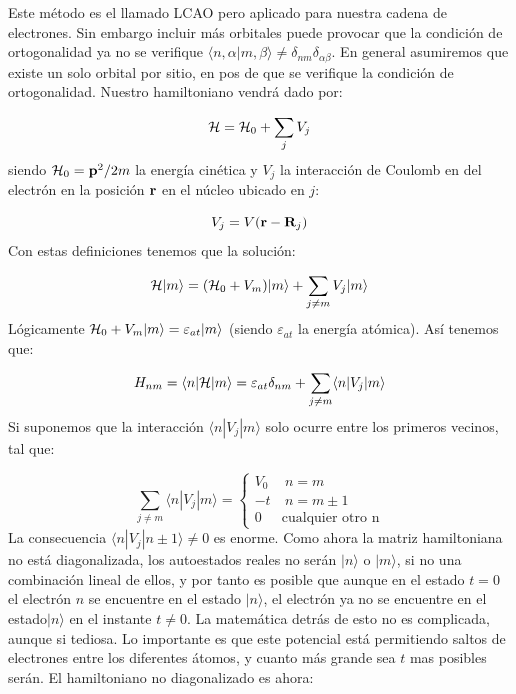 Este método es el llamado LCAO pero aplicado para nuestra cadena de electrones. Sin embargo incluir más orbitales puede provocar que la condición de ortogonalidad ya no se verifique $\langle n ,\alpha | m,\beta \rangle \neq \delta_{nm} \delta_{\alpha \beta}$. En general asumiremos que existe un solo orbital por sitio, en pos de que se verifique la condición de ortogonalidad. Nuestro hamiltoniano vendrá dado por:

\begin{equation}
	\mathcal{H} = \mathcal{H}_0 + \sum_{j} V_j
\end{equation}
siendo $\mathcal{H}_0 = \mathbf{p}^2 /2m$ la energía cinética y $V_j$ la interacción de Coulomb en del electrón en la posición $\mathbf{r}$ en el núcleo ubicado en $j$:

\begin{equation}
	V_j = V(\mathbf{r}-\mathbf{R}_j)
\end{equation}
Con estas definiciones tenemos que la solución:

\begin{equation}
	\mathcal{H} |m\rangle = (\mathcal{H}_0 + V_m) |m\rangle + \sum_{j\neq m} V_j |m\rangle
\end{equation}
Lógicamente $\mathcal{H}_0 +V_m |m\rangle = \varepsilon_{at}|m\rangle$ (siendo $\varepsilon_{at}$ la energía atómica). Así tenemos que:

\begin{equation}
	H_{nm} = \langle n | \mathcal{H} | m \rangle = \varepsilon_{at} \delta_{nm}+\sum_{j\neq m} \langle n |V_j |m\rangle
\end{equation}
Si suponemos que la interacción $\langle n | V_j | m \rangle$ solo ocurre entre los primeros vecinos, tal que:

\begin{equation}
	\sum_{j\neq m} \langle n |V_j |m\rangle = \left\lbrace \begin{array}{lc}
		V_0 & \ n=m \\
		-t & \ n=m\pm 1 \\
		 0 & \text{cualquier otro n}
	\end{array} \right.
\end{equation}
La consecuencia $\langle n|V_j|n\pm1\rangle \neq 0$ es enorme. Como ahora la matriz hamiltoniana no está diagonalizada, los autoestados reales no serán $|n\rangle$ o $|m\rangle$, si no una combinación lineal de ellos, y por tanto es posible que aunque en el estado $t=0$ el electrón $n$ se encuentre en el estado $|n\rangle$, el electrón ya no se encuentre en el estado$|n\rangle$ en el instante $t\neq 0$. La matemática detrás de esto no es complicada, aunque si tediosa. Lo importante es que este potencial está permitiendo saltos de electrones entre los diferentes átomos, y cuanto más grande sea $t$ mas posibles serán. El hamiltoniano no diagonalizado es ahora:


